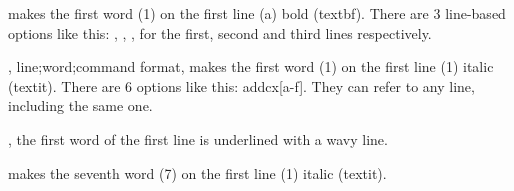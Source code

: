 \documentclass{article}
\begin{document}
%




\begin{exe}
\ex  {}
\end{exe}


 makes the first word (1) on the first line (a) bold (textbf). There are 3 line-based options like this:
, , , for the first, second and third lines respectively.

, line;word;command format, makes the first word (1) on the first line (1) italic (textit). There are 6 options like this: addcx[a-f]. They can refer to any line, including the same one.

, the first word of the first line is underlined with a wavy line.

 makes the seventh word (7) on the first line (1) italic (textit).




\begin{exe}
\ex  
{}
\end{exe}




\end{document}

